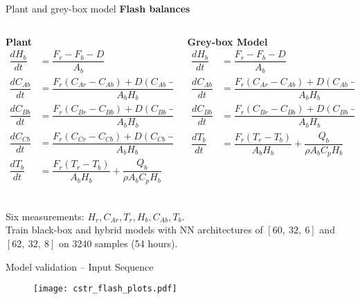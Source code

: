 \documentclass[xcolor=dvipsnames, 8pt]{beamer} %
\begin{document}
\begin{frame}{Plant and grey-box model}
	\textbf{Flash balances}
	\vspace{0.2in}
	\begin{columns}
		\begin{column}{0.45\textwidth}
			\textbf{Plant} \\
			\begin{align*}
				\dfrac{dH_b}{dt} &= \dfrac{F_r - F_b - D}{A_b} \\
				\dfrac{dC_{Ab}}{dt} &= \dfrac{F_r(C_{Ar} -C_{Ab}) + 
										D(C_{Ab} -C_{Ad})}{A_bH_b} \\
				\dfrac{dC_{Bb}}{dt} &= \dfrac{F_r(C_{Br} -C_{Bb}) + 
										D(C_{Bb} -C_{Bd})}{A_bH_b} \\
				\dfrac{dC_{Cb}}{dt} &= \dfrac{F_r(C_{Cr} -C_{Cb}) + 
										D(C_{Cb} -C_{Cd})}{A_bH_b} \\
				\dfrac{dT_b}{dt} &= \dfrac{F_r(T_r - T_b)}{A_bH_b} + \dfrac{Q_b}{\rho A_b C_p H_b}\\
			  \end{align*}		
		\end{column}
		\begin{column}{0.45\textwidth}
			\textbf{Grey-box Model}
			\begin{align*}
				\dfrac{dH_b}{dt} &= \dfrac{F_r - F_b - D}{A_b} \\
				\dfrac{dC_{Ab}}{dt} &= \dfrac{F_r(C_{Ar} -C_{Ab}) + 
										D(C_{Ab} -C_{Ad})}{A_bH_b} \\
				\dfrac{dC_{Bb}}{dt} &= \dfrac{F_r(C_{Br} -C_{Bb}) + 
										D(C_{Bb} -C_{Bd})}{A_bH_b} \\
				\dfrac{dT_b}{dt} &= \dfrac{F_r(T_r - T_b)}{A_bH_b} +
									\dfrac{Q_b}{\rho A_b C_p H_b}\\
			\end{align*}
		\end{column}
	\end{columns}
	Six measurements: $H_r, C_{Ar}, T_r, H_b, C_{Ab}, T_b$. \\
	Train black-box and hybrid models with NN 
	architectures of $[60, \ 32, \ 6]$ and $[62, \ 32, \ 8]$
	on 3240 samples (54 hours).	
\end{frame}

\begin{frame}{Model validation -- Input Sequence}
	\begin{figure}
	\centering
	\texttt{[image: cstr\_flash\_plots.pdf]}
	\end{figure}
\end{frame}
	
\end{document}
